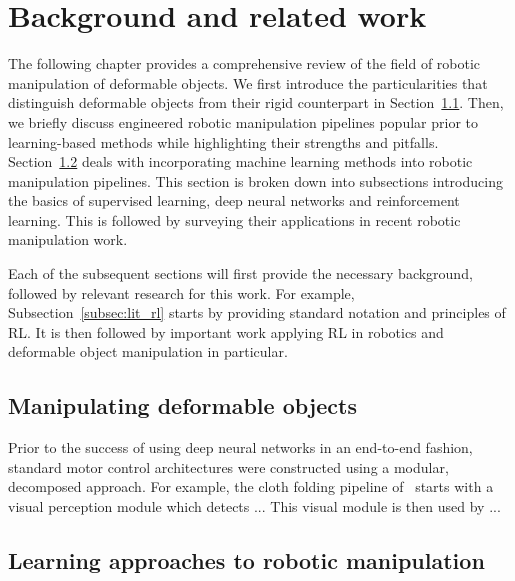 \documentclass[\home/main.tex]{subfiles}
\begin{document}
\chapter{Background and related work}\label{ch:lit} 

The following chapter provides a comprehensive review of the field of robotic manipulation of deformable objects. We first introduce the particularities that distinguish deformable objects from their rigid counterpart in Section~\ref{sec:lit_traditional}. Then, we briefly discuss engineered robotic manipulation pipelines popular prior to learning-based methods while highlighting their strengths and pitfalls. Section~\ref{sec:lit_learning} deals with incorporating machine learning methods into robotic manipulation pipelines. This section is broken down into subsections introducing the basics of supervised learning, deep neural networks and reinforcement learning. This is followed by surveying their applications in recent robotic manipulation work. 

Each of the subsequent sections will first provide the necessary background, followed by relevant research for this work. For example, Subsection~\ref{subsec:lit_rl} starts by providing standard notation and principles of RL. It is then followed by important work applying RL in robotics and deformable object manipulation in particular.

\section{Manipulating deformable objects} \label{sec:lit_traditional}

Prior to the success of using deep neural networks in an end-to-end fashion, standard motor control architectures were constructed using a modular, decomposed approach. For example, the cloth folding pipeline of~\citeauthor{Doumanoglou2016} starts with a visual perception module which detects ... This visual module is then used by ...

\section{Learning approaches to robotic manipulation} \label{sec:lit_learning}
\end{document}
